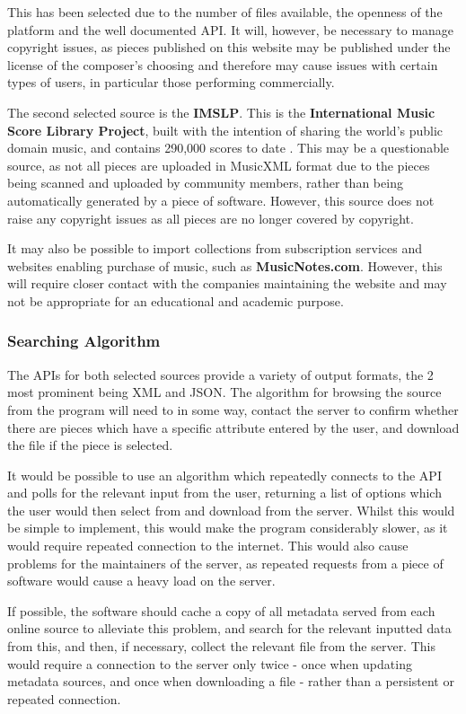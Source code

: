 This has been selected due to the number of files available, the openness of the platform and the well documented API. It will, however, be necessary to manage copyright issues, as pieces published on this website may be published under the license of the composer's choosing and therefore may cause issues with certain types of users, in particular those performing commercially.

The second selected source is the \textbf{IMSLP}. This is the \textbf{International Music Score Library Project}, built with the intention of sharing the world’s public domain music, and contains 290,000 scores to date \parencite{imslp}. This may be a questionable source, as not all pieces are uploaded in MusicXML format due to the pieces being scanned and uploaded by community members, rather than being automatically generated by a piece of software. However, this source does not raise any copyright issues as all pieces are no longer covered by copyright.

It may also be possible to import collections from subscription services and websites enabling purchase of music, such as \textbf{MusicNotes.com}. However, this will require closer contact with the companies maintaining the website and may not be appropriate for an educational and academic purpose.

\subsubsection{Searching Algorithm}
The APIs for both selected sources provide a variety of output formats, the 2 most prominent being XML and JSON. The algorithm for browsing the source from the program will need to in some way, contact the server to confirm whether there are pieces which have a specific attribute entered by the user, and download the file if the piece is selected.

It would be possible to use an algorithm which repeatedly connects to the API and polls for the relevant input from the user, returning a list of options which the user would then select from and download from the server. Whilst this would be simple to implement, this would make the program considerably slower, as it would require repeated connection to the internet. This would also cause problems for the maintainers of the server, as repeated requests from a piece of software would cause a heavy load on the server.

If possible, the software should cache a copy of all metadata served from each online source to alleviate this problem, and search for the relevant inputted data from this, and then, if necessary, collect the relevant file from the server. This would require a connection to the server only twice - once when updating metadata sources, and once when downloading a file - rather than a persistent or repeated connection. 

